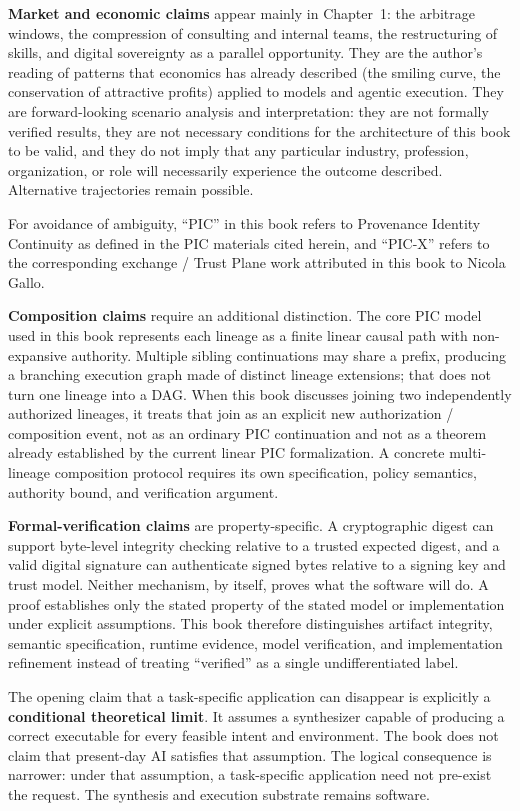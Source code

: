 \documentclass[10pt,oneside,openany]{book}
\begin{document}
\textbf{Market and economic claims} appear mainly in Chapter~1: the arbitrage windows, the compression of consulting and internal teams, the restructuring of skills, and digital sovereignty as a parallel opportunity. They are the author's reading of patterns that economics has already described (the smiling curve, the conservation of attractive profits) applied to models and agentic execution. They are forward-looking scenario analysis and interpretation: they are not formally verified results, they are not necessary conditions for the architecture of this book to be valid, and they do not imply that any particular industry, profession, organization, or role will necessarily experience the outcome described. Alternative trajectories remain possible.

For avoidance of ambiguity, ``PIC'' in this book refers to Provenance Identity Continuity as defined in the PIC materials cited herein, and ``PIC-X'' refers to the corresponding exchange / Trust Plane work attributed in this book to Nicola Gallo.

\textbf{Composition claims} require an additional distinction. The core PIC model used in this book represents each lineage as a finite linear causal path with non-expansive authority. Multiple sibling continuations may share a prefix, producing a branching execution graph made of distinct lineage extensions; that does not turn one lineage into a DAG. When this book discusses joining two independently authorized lineages, it treats that join as an explicit new authorization / composition event, not as an ordinary PIC continuation and not as a theorem already established by the current linear PIC formalization. A concrete multi-lineage composition protocol requires its own specification, policy semantics, authority bound, and verification argument.

\textbf{Formal-verification claims} are property-specific. A cryptographic digest can support byte-level integrity checking relative to a trusted expected digest, and a valid digital signature can authenticate signed bytes relative to a signing key and trust model. Neither mechanism, by itself, proves what the software will do. A proof establishes only the stated property of the stated model or implementation under explicit assumptions. This book therefore distinguishes artifact integrity, semantic specification, runtime evidence, model verification, and implementation refinement instead of treating ``verified'' as a single undifferentiated label.

The opening claim that a task-specific application can disappear is explicitly a \textbf{conditional theoretical limit}. It assumes a synthesizer capable of producing a correct executable for every feasible intent and environment. The book does not claim that present-day AI satisfies that assumption. The logical consequence is narrower: under that assumption, a task-specific application need not pre-exist the request. The synthesis and execution substrate remains software.
\end{document}
